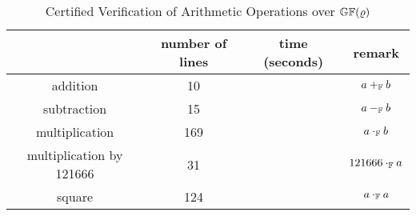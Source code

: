 \begin{table}[ht]
  \caption{Certified Verification of Arithmetic Operations over
    $\mathbb{GF}(\varrho)$}
  \centering
  \begin{tabular}{|c|c|c|c|}
    \hline
             & number of lines & time (seconds) & remark\\
    \hline
    addition & 10 &                       & $a +_{\mathbb{F}} b$ \\
    \hline
    subtraction & 15 &                    & $a -_{\mathbb{F}} b$ \\
    \hline
    multiplication & 169 &                & $a \cdot_{\mathbb{F}} b$\\
    \hline
    multiplication by 121666 & 31 &       & $121666 \cdot_{\mathbb{F}} a$\\
    \hline
    square & 124 &                        & $a \cdot_{\mathbb{F}} a$\\
    \hline
  \end{tabular}
  \label{table:arithmetic-operations}
\end{table}
